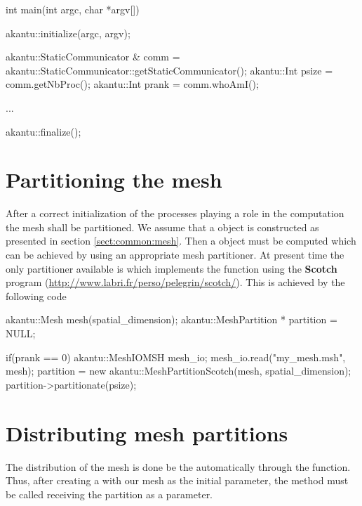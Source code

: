 \begin{cpp}
int main(int argc, char *argv[])
{
  akantu::initialize(argc, argv);

  akantu::StaticCommunicator & comm =
  akantu::StaticCommunicator::getStaticCommunicator();
  akantu::Int psize = comm.getNbProc();
  akantu::Int prank = comm.whoAmI();

  ... 

  akantu::finalize();
}
\end{cpp} 

\section{Partitioning the mesh}

After a correct initialization of the processes playing a role in the 
computation the mesh shall be partitioned. We assume that a  object 
is constructed as presented in section \ref{sect:common:mesh}.
Then a  object must be computed which can be achieved 
by using an appropriate mesh partitioner. At present time the only partitioner 
available is  which implements the function
 using the \textbf{Scotch} program 
(\url{http://www.labri.fr/perso/pelegrin/scotch/}). 
This is achieved by the following code

\begin{cpp}
  akantu::Mesh mesh(spatial_dimension);
  akantu::MeshPartition * partition = NULL;
  
  if(prank == 0) {
    akantu::MeshIOMSH mesh_io;
    mesh_io.read("my_mesh.msh", mesh);
    partition = new akantu::MeshPartitionScotch(mesh, spatial_dimension);
    partition->partitionate(psize);
  }
\end{cpp} 


\section{Distributing mesh partitions}

The distribution of the mesh is done be the 
automatically through the  function. 
Thus, after creating a  with our mesh 
as the initial parameter, the  method must be called 
receiving the partition as a parameter.

